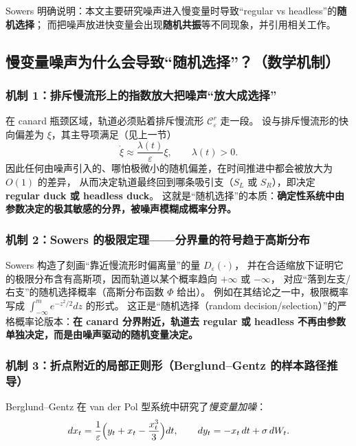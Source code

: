 Sowers 明确说明：本文主要研究噪声进入慢变量时导致“regular vs headless”的\textbf{随机选择}；
而把噪声放进快变量会出现\textbf{随机共振}等不同现象，并引用相关工作。%

\subsection{慢变量噪声为什么会导致“随机选择”？（数学机制）}

\subsubsection{机制 1：排斥慢流形上的指数放大把噪声“放大成选择”}
在 canard 瓶颈区域，轨道必须贴着排斥慢流形 $\mathcal C_\varepsilon^{r}$ 走一段。
设与排斥慢流形的快向偏差为 $\xi$，其主导项满足（见上一节）
\[
\dot \xi \approx \frac{\lambda(t)}{\varepsilon}\xi,\qquad \lambda(t)>0.
\]
因此任何由噪声引入的、哪怕极微小的随机偏差，在时间推进中都会被放大为 $O(1)$ 的差异，
从而决定轨道最终回到哪条吸引支（$S_L$ 或 $S_R$），即决定 \textbf{regular duck 或 headless duck}。
这就是“随机选择”的本质：\textbf{确定性系统中由参数决定的极其敏感的分界，被噪声模糊成概率分界。}

\subsubsection{机制 2：Sowers 的极限定理——分界量的符号趋于高斯分布}
Sowers 构造了刻画“靠近慢流形时偏离量”的量 $D_\varepsilon(\cdot)$，
并在合适缩放下证明它的极限分布含有高斯项，因而轨道以某个概率趋向 $+\infty$ 或 $-\infty$，
对应“落到左支/右支”的随机选择概率（高斯分布函数 $\Phi$ 给出）。
例如在其结论之一中，极限概率写成 $\int_{-\infty}^{m} e^{-z^2/2}dz$ 的形式。%
这正是“随机选择（random decision/selection）”的严格概率论版本：\textbf{在 canard 分界附近，轨道去 regular 或 headless 不再由参数单独决定，而是由噪声驱动的随机变量决定。}

\subsubsection{机制 3：折点附近的局部正则形（Berglund--Gentz 的样本路径推导）}
Berglund--Gentz 在 van der Pol 型系统中研究了\emph{慢变量加噪}：
\begin{equation}\label{eq:BG-619}
	dx_t=\frac{1}{\varepsilon}\Bigl(y_t+x_t-\frac{x_t^3}{3}\Bigr)dt,\qquad
	dy_t=-x_t\,dt+\sigma\,dW_t .
\end{equation}

